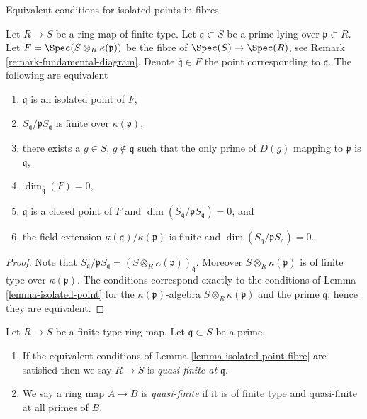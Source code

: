 \begin{lemma}
\label{lemma-isolated-point-fibre}
\begin{slogan}
Equivalent conditions for isolated points in fibres
\end{slogan}
Let $R \to S$ be a ring map of finite type.
Let $\mathfrak q \subset S$ be a prime lying over
$\mathfrak p \subset R$. Let $F = \Spec(S \otimes_R \kappa(\mathfrak p))$
be the fibre of $\Spec(S) \to \Spec(R)$, see
Remark \ref{remark-fundamental-diagram}.
Denote $\overline{\mathfrak q} \in F$ the point corresponding to
$\mathfrak q$. The following are equivalent
\begin{enumerate}
\item $\overline{\mathfrak q}$ is an isolated point of $F$,
\item $S_{\mathfrak q}/\mathfrak pS_{\mathfrak q}$ is finite over
$\kappa(\mathfrak p)$,
\item there exists a $g \in S$, $g \not \in \mathfrak q$ such that
the only prime of $D(g)$ mapping to $\mathfrak p$ is $\mathfrak q$,
\item $\dim_{\overline{\mathfrak q}}(F) = 0$,
\item $\overline{\mathfrak q}$ is a closed point of $F$ and
$\dim(S_{\mathfrak q}/\mathfrak pS_{\mathfrak q}) = 0$, and
\item the field extension $\kappa(\mathfrak q)/\kappa(\mathfrak p)$
is finite and $\dim(S_{\mathfrak q}/\mathfrak pS_{\mathfrak q}) = 0$.
\end{enumerate}
\end{lemma}

\begin{proof}
Note that $S_{\mathfrak q}/\mathfrak pS_{\mathfrak q} =
(S \otimes_R \kappa(\mathfrak p))_{\overline{\mathfrak q}}$.
Moreover $S \otimes_R \kappa(\mathfrak p)$ is of finite type over
$\kappa(\mathfrak p)$.
The conditions correspond exactly to the conditions of
Lemma \ref{lemma-isolated-point}
for the $\kappa(\mathfrak p)$-algebra $S \otimes_R \kappa(\mathfrak p)$
and the prime $\overline{\mathfrak q}$, hence they are equivalent.
\end{proof}

\begin{definition}
\label{definition-quasi-finite}
Let $R \to S$ be a finite type ring map.
Let $\mathfrak q \subset S$ be a prime.
\begin{enumerate}
\item If the equivalent conditions of Lemma \ref{lemma-isolated-point-fibre}
are satisfied then we say $R \to S$ is {\it quasi-finite at $\mathfrak q$}.
\item We say a ring map $A \to B$ is {\it quasi-finite}
if it is of finite type and quasi-finite at all primes of $B$.
\end{enumerate}
\end{definition}

